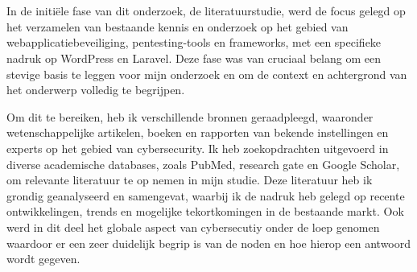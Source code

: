 
\chapter{}%
\label{ch:methodologie}


In de initiële fase van dit onderzoek, de literatuurstudie, werd de focus gelegd op het verzamelen van bestaande kennis 
en onderzoek op het gebied van webapplicatiebeveiliging, pentesting-tools en frameworks, met een specifieke nadruk op 
WordPress en Laravel. Deze fase was van cruciaal 
belang om een stevige basis te leggen voor mijn onderzoek en om de context en achtergrond van het onderwerp volledig te 
begrijpen.

Om dit te bereiken, heb ik verschillende bronnen geraadpleegd, waaronder wetenschappelijke artikelen, boeken  
en rapporten van bekende instellingen en experts op het gebied van cybersecurity. 
Ik heb zoekopdrachten uitgevoerd in diverse academische databases, zoals PubMed, research gate en 
Google Scholar, om relevante literatuur te op nemen in mijn studie. Deze literatuur heb ik grondig geanalyseerd en 
samengevat, waarbij ik de nadruk heb gelegd op recente ontwikkelingen, trends en mogelijke tekortkomingen in de bestaande markt.
Ook werd in dit deel het globale aspect van cybersecutiy onder de loep genomen waardoor er een zeer duidelijk begrip 
is van de noden en hoe hierop een antwoord wordt gegeven.

